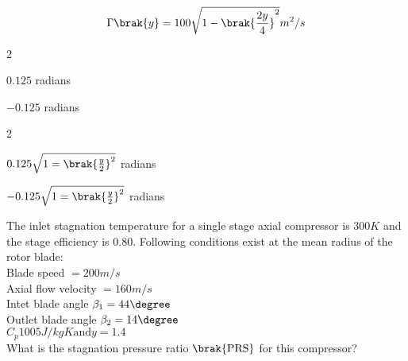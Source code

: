 	\begin{align*}
		\Gamma\brak{y}=100\sqrt{1-\brak{\frac{2y}{4}}^2} m^2/s
	\end{align*}
	\begin{enumerate}
	\end{enumerate}
\item The inlet stagnation temperature for a single stage axial compressor is $300 K$ and the stage efficiency is $0.80$. Following conditions exist at the mean radius of the rotor blade: \\
	Blade speed $= 200 m/s$\\
	Axial flow velocity $=160 m/s$\\
	Intet blade angle $\beta_1 = 44\degree$\\
	Outlet blade angle $\beta_2 = 14\degree$\\
	$C_p 1005 J/kgK \text{and} y= 1.4$\\
	What is the stagnation pressure ratio $\brak{\text{PRS}}$ for this compressor?

